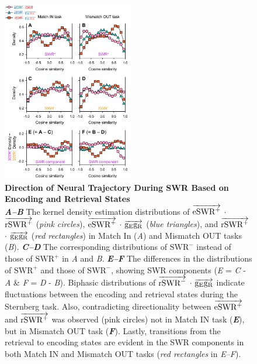 \documentclass[preprint,review,12pt]{elsarticle}%
\begin{document}
        \clearpage
        \begin{figure}[ht]
        	\centering
            \includegraphics[width=0.5\textwidth]{./src/figures/.png/Figure_ID_07.png}
        	\caption{\textbf{
Direction of Neural Trajectory During SWR Based on Encoding and Retrieval States
}
\smallskip
\\
\textbf{\textit{A--B}} The kernel density estimation distributions of $\protect\overrightarrow{{\mathrm{eSWR^+}}}$ $\cdot$ $\protect\overrightarrow{{\mathrm{rSWR^+}}}$ (\textit{pink circles}), $\protect\overrightarrow{{\mathrm{eSWR^+}}}$ $\cdot$ $\protect\overrightarrow{{\mathrm{g_{E}g_{R}}}}$ (\textit{blue triangles}), and $\protect\overrightarrow{{\mathrm{rSWR^+}}}$ $\cdot$ $\protect\overrightarrow{{\mathrm{g_{E}g_{R}}}}$ (\textit{red rectangles}) in Match In (\textit{A}) and Mismatch OUT tasks (\textit{B}). \textbf{\textit{C--D}} The corresponding distributions of $\mathrm{SWR^-}$ instead of those of $\mathrm{SWR^+}$ in \textit{A} and \textit{B}. \textbf{\textit{E--F}} The differences in the distributions of $\mathrm{SWR^+}$ and those of $\mathrm{SWR^-}$, showing SWR components (\textit{E} = \textit{C} - \textit{A} \& \textit{F} = \textit{D} - \textit{B}). Biphasic distributions of $\protect\overrightarrow{{\mathrm{rSWR^-}}}$ $\cdot$ $\protect\overrightarrow{{\mathrm{g_{E}g_{R}}}}$ indicate fluctuations between the encoding and retrieval states during the Sternberg task. Also, contradicting directionality between $\protect\overrightarrow{{\mathrm{eSWR^+}}}$ and $\protect\overrightarrow{{\mathrm{rSWR^+}}}$ was observed (pink circles) not in Match IN task (\textbf{\textit{E}}), but in Mismatch OUT task (\textbf{\textit{F}}). Lastly, transitions from the retrieval to encoding states are evident in the SWR components in both Match IN and Mismatch OUT tasks (\textit{red rectangles} in \textit{E--F}).
}
        	\label{fig:07}
        \end{figure}

\end{document}
